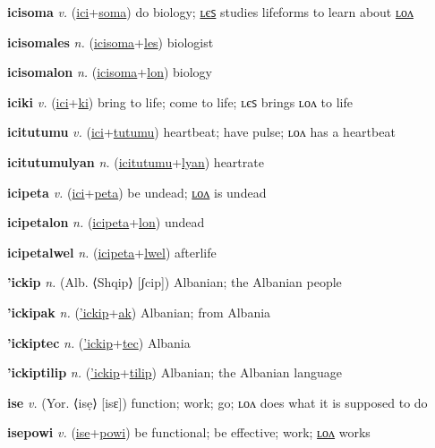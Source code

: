 \textbf{\hypertarget{icisoma}{icisoma}} \textit{v.} (\hyperlink{ici}{ici}+\allowbreak \hyperlink{soma}{soma})
do biology; \hyperlink{icisomales}{ʟєꜱ} studies lifeforms to learn about \hyperlink{icisomalon}{ʟᴏᴧ}

\textbf{\hypertarget{icisomales}{icisomales}} \textit{n.} (\hyperlink{icisoma}{icisoma}+\allowbreak \hyperlink{les}{les})
biologist

\textbf{\hypertarget{icisomalon}{icisomalon}} \textit{n.} (\hyperlink{icisoma}{icisoma}+\allowbreak \hyperlink{lon}{lon})
biology

\textbf{\hypertarget{iciki}{iciki}} \textit{v.} (\hyperlink{ici}{ici}+\allowbreak \hyperlink{ki}{ki})
bring to life; come to life; ʟєꜱ brings ʟᴏᴧ to life

\textbf{\hypertarget{icitutumu}{icitutumu}} \textit{v.} (\hyperlink{ici}{ici}+\allowbreak \hyperlink{tutumu}{tutumu})
heartbeat; have pulse; ʟᴏᴧ has a heartbeat

\textbf{\hypertarget{icitutumulyan}{icitutumulyan}} \textit{n.} (\hyperlink{icitutumu}{icitutumu}+\allowbreak \hyperlink{lyan}{lyan})
heartrate

\textbf{\hypertarget{icipeta}{icipeta}} \textit{v.} (\hyperlink{ici}{ici}+\allowbreak \hyperlink{peta}{peta})
be undead; \hyperlink{icipetalon}{ʟᴏᴧ} is undead

\textbf{\hypertarget{icipetalon}{icipetalon}} \textit{n.} (\hyperlink{icipeta}{icipeta}+\allowbreak \hyperlink{lon}{lon})
undead

\textbf{\hypertarget{icipetalwel}{icipetalwel}} \textit{n.} (\hyperlink{icipeta}{icipeta}+\allowbreak \hyperlink{lwel}{lwel})
afterlife

\textbf{\hypertarget{'ickip}{'ickip}} \textit{n.} (Alb. ⟨Shqip⟩ [ʃcip])
Albanian; the Albanian people

\textbf{\hypertarget{'ickipak}{'ickipak}} \textit{n.} (\hyperlink{'ickip}{'ickip}+\allowbreak \hyperlink{ak}{ak})
Albanian; from Albania

\textbf{\hypertarget{'ickiptec}{'ickiptec}} \textit{n.} (\hyperlink{'ickip}{'ickip}+\allowbreak \hyperlink{tec}{tec})
Albania

\textbf{\hypertarget{'ickiptilip}{'ickiptilip}} \textit{n.} (\hyperlink{'ickip}{'ickip}+\allowbreak \hyperlink{tilip}{tilip})
Albanian; the Albanian language

\textbf{\hypertarget{ise}{ise}} \textit{v.} (Yor. ⟨isẹ⟩ [isɛ])
function; work; go; ʟᴏᴧ does what it is supposed to do

\textbf{\hypertarget{isepowi}{isepowi}} \textit{v.} (\hyperlink{ise}{ise}+\allowbreak \hyperlink{powi}{powi})
be functional; be effective; work; \hyperlink{isepowilon}{ʟᴏᴧ} works

